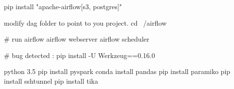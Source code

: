 pip install "apache-airflow[s3, postgres]"

modify dag folder to point to you project.
cd ~/airflow

# run airflow
airflow webserver
airflow scheduler

# bug detected :
pip install -U Werkzeug==0.16.0


python 3.5
pip install pyspark 
conda install pandas 
pip install paramiko
pip install sshtunnel
pip install tika
